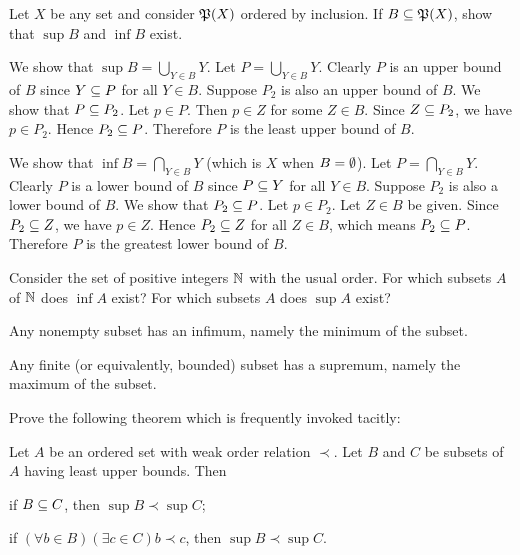 \begin{exercise}
Let $X$ be any set and consider $\operatorname{\mathfrak{P}}(X)$ ordered by inclusion. If $B\subseteq\operatorname{\mathfrak{P}}(X)$, show that
$\sup B$ and $\inf B$ exist.
\end{exercise}

\begin{solution}
We show that $\sup B = \bigcup_{Y\in B} Y$. Let $P=\bigcup_{Y\in B} Y$.
Clearly $P$ is an upper bound of $B$ since $Y\subseteq P$ for all $Y\in B$.
Suppose $P_2$ is also an upper bound of $B$. We show that $P\subseteq P_2$.
Let $p\in P$. Then $p\in Z$ for some
$Z\in B$. Since $Z\subseteq P_2$, we have $p\in P_2$. Hence $P_2\subseteq P$.
Therefore $P$ is the least upper bound of $B$.

We show that $\inf B = \bigcap_{Y\in B}Y$ (which is $X$ when $B=\emptyset$).
Let $P=\bigcap_{Y\in B} Y$.
Clearly $P$ is a lower bound of $B$ since $P\subseteq Y$ for all $Y\in B$.
Suppose $P_2$ is also a lower bound of $B$. We show that $P_2\subseteq P$.
Let $p\in P_2$. Let $Z\in B$ be given. Since $P_2\subseteq Z$, we have $p\in Z$.
Hence $P_2\subseteq Z$ for all $Z\in B$, which means $P_2\subseteq P$.
Therefore $P$ is the greatest lower bound of $B$.
\end{solution}

\begin{exercise}
Consider the set of positive integers $\mathbb{N}$ with the usual order. For which subsets
$A$ of $\mathbb{N}$ does $\inf A$ exist? For which subsets $A$ does $\sup A$ exist?
\end{exercise}

\begin{solution}
Any nonempty subset has an infimum, namely the minimum of the subset.

Any finite (or equivalently, bounded) subset has a supremum, namely the maximum of the subset.
\end{solution}

\begin{exercise}
Prove the following theorem which is frequently invoked tacitly:

Let $A$ be an ordered set with weak order relation $\prec$. Let $B$ and $C$ be subsets of $A$
having least upper bounds. Then
\begin{enumroman}
    \item if $B\subseteq C$, then $\sup B \prec \sup C$;
    \item if $(\forall b\in B)(\exists c\in C)b\prec c$, then $\sup B\prec\sup C$.
\end{enumroman}
\end{exercise}

